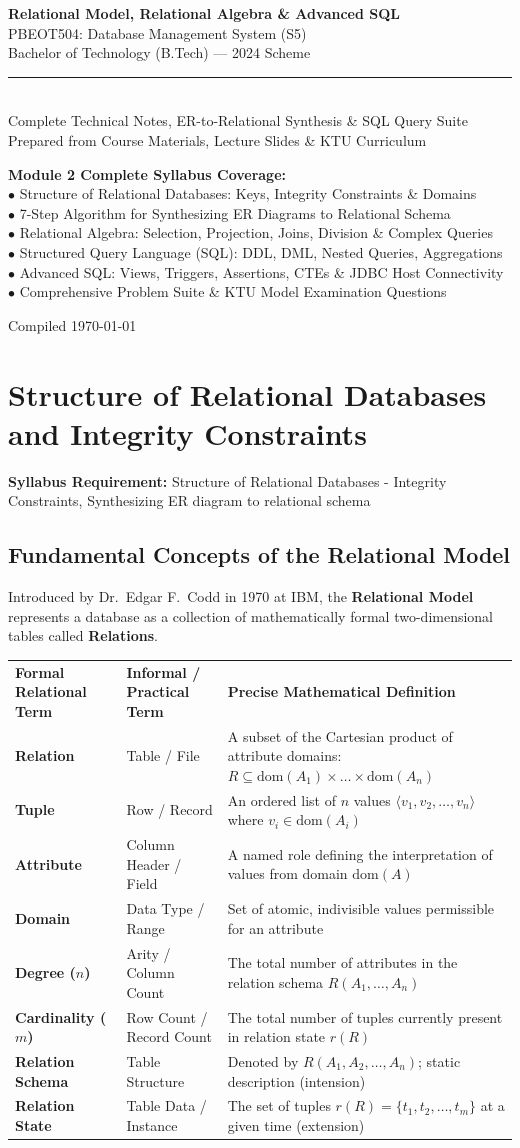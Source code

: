\documentclass[11pt,a4paper]{article}
\newcommand{\docsubject}{PBEOT504: Database Management System (S5)}
\newcommand{\doctitle}{Relational Model, Relational Algebra \& Advanced SQL}
\newcommand{\syllabusitem}[1]{%
  \begin{tcolorbox}[enhanced, colback=AnthOrange!8, colframe=AnthOrange, boxrule=0.4pt, arc=3pt, left=7pt, right=7pt, top=3pt, bottom=3pt]
    \small\sffamily\textbf{\color{AnthOrange}Syllabus Requirement:} #1
  \end{tcolorbox}
}
\newcommand{\maketitlepage}{%
  \begin{titlepage}
    \pagecolor{AnthDark}
    \color{AnthLight}
    \vspace*{2.2cm}
    \begin{center}
      {\huge\bfseries\sffamily \doctitle}\\[0.8em]
      {\Large\sffamily\color{AnthOrange} \docsubject}\\[0.4em]
      {\large\sffamily\color{AnthMidGray} Bachelor of Technology (B.Tech) — 2024 Scheme}\\[2.0em]
      \color{AnthOrange}\rule{0.5\textwidth}{1.2pt}\\[1.8em]
      {\normalsize\sffamily\color{AnthLightGray} Complete Technical Notes, ER-to-Relational Synthesis \& SQL Query Suite}\\[0.4em]
      {\small\sffamily\color{AnthMidGray} Prepared from Course Materials, Lecture Slides \& KTU Curriculum}\\[2.8em]
      \begin{tcolorbox}[enhanced, width=0.84\textwidth, colback=AnthDark!90, colframe=AnthOrange!60, arc=4pt, boxrule=0.6pt]
        \centering\small\sffamily\color{AnthLight}
        \textbf{Module 2 Complete Syllabus Coverage:}\\[3pt]
        $\bullet$ Structure of Relational Databases: Keys, Integrity Constraints \& Domains\\
        $\bullet$ 7-Step Algorithm for Synthesizing ER Diagrams to Relational Schema\\
        $\bullet$ Relational Algebra: Selection, Projection, Joins, Division \& Complex Queries\\
        $\bullet$ Structured Query Language (SQL): DDL, DML, Nested Queries, Aggregations\\
        $\bullet$ Advanced SQL: Views, Triggers, Assertions, CTEs \& JDBC Host Connectivity\\
        $\bullet$ Comprehensive Problem Suite \& KTU Model Examination Questions
      \end{tcolorbox}
      \vfill
      {\small\sffamily\color{AnthMidGray} Compiled \today}
    \end{center}
    \vspace*{0.8cm}
  \end{titlepage}
  \pagecolor{AnthLight}
  \color{AnthDark}
}
\begin{document}
\maketitlepage

\thispagestyle{empty}
{
  \hypersetup{hidelinks}
  \tableofcontents
}
\clearpage

\section{Structure of Relational Databases and Integrity Constraints}

\syllabusitem{Structure of Relational Databases - Integrity Constraints, Synthesizing ER diagram to relational schema}

\subsection{Fundamental Concepts of the Relational Model}

Introduced by Dr.~Edgar F.~Codd in 1970 at IBM, the \textbf{Relational Model} represents a database as a collection of mathematically formal two-dimensional tables called \textbf{Relations}.

\begin{center}
\small
\begin{tabularx}{\textwidth}{L{3.5cm} L{3.5cm} X}
  \color{white}\textbf{Formal Relational Term} & \color{white}\textbf{Informal / Practical Term} & \color{white}\textbf{Precise Mathematical Definition} \\
   \textbf{Relation} & Table / File & A subset of the Cartesian product of attribute domains: $R \subseteq \text{dom}(A_1) \times \dots \times \text{dom}(A_n)$ \\
  \textbf{Tuple} & Row / Record & An ordered list of $n$ values $\langle v_1, v_2, \dots, v_n \rangle$ where $v_i \in \text{dom}(A_i)$ \\
   \textbf{Attribute} & Column Header / Field & A named role defining the interpretation of values from domain $\text{dom}(A)$ \\
  \textbf{Domain} & Data Type / Range & Set of atomic, indivisible values permissible for an attribute \\
   \textbf{Degree ($n$)} & Arity / Column Count & The total number of attributes in the relation schema $R(A_1, \dots, A_n)$ \\
  \textbf{Cardinality ($m$)} & Row Count / Record Count & The total number of tuples currently present in relation state $r(R)$ \\
   \textbf{Relation Schema} & Table Structure & Denoted by $R(A_1, A_2, \dots, A_n)$; static description (intension) \\
  \textbf{Relation State} & Table Data / Instance & The set of tuples $r(R) = \{t_1, t_2, \dots, t_m\}$ at a given time (extension) \\
\end{tabularx}
\end{center}
\end{document}

